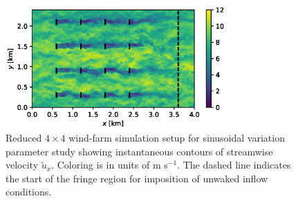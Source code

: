 \begin{figure}
	\centering
	\includegraphics[width=0.75\textwidth]{chapters/analysis_induction_control/setup_sinusoidal.eps}
	\caption[Reduced $4 \times 4$ wind-farm simulation setup for sinusoidal variation parameter study showing instantaneous contours of streamwise velocity $\widetilde{u}_x$.]{Reduced $4 \times 4$ wind-farm simulation setup for sinusoidal variation parameter study showing instantaneous contours of streamwise velocity $\widetilde{u}_x$. Coloring is in units of m s$^{-1}$. The dashed line indicates the start of the fringe region for imposition of unwaked inflow conditions. \label{fig:sinus_setup}}
\end{figure}

